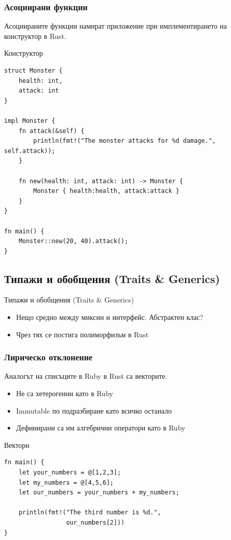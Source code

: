 \documentclass[xcolor=x11names,compress]{beamer}
\renewcommand{\(}{\begin{columns}}
\renewcommand{\)}{\end{columns}}
\newcommand{\<}[1]{\begin{column}{#1}}
\renewcommand{\>}{\end{column}}
\begin{document}
\begin{frame}[fragile]
  \frametitle{Асоциирани функции}

  \pause
  Асоциираните функции намират приложение при имплементирането на конструктор в Rust.

  \pause \vspace{0.5cm}
  \begin{block}{Конструктор}
    \begin{lstlisting}[basicstyle=\tiny]
struct Monster {
    health: int,
    attack: int
}

impl Monster {
    fn attack(&self) {
        println(fmt!("The monster attacks for %d damage.", self.attack));
    }

    fn new(health: int, attack: int) -> Monster {
        Monster { health:health, attack:attack }
    }
}

fn main() {
    Monster::new(20, 40).attack();
}
    \end{lstlisting}
  \end{block}
\end{frame}

\subsection{Типажи и обобщения (Traits \& Generics)}
\begin{frame}{Типажи и обобщения (Traits \& Generics)}
  \begin{itemize}
  \item Нещо средно между миксин и интерфейс. \pause Абстрактен клас? \pause
  \item Чрез тях се постига полиморфизъм в Rust
  \end{itemize}
\end{frame}

\begin{frame}[fragile]
  \frametitle{Лирическо отклонение}
  Аналогът на списъците в Ruby в Rust са векторите.

  \begin{itemize}[<+->]
  \item Не са хетерогенни като в Ruby
  \item Immutable по подразбиране като всичко останало
  \item Дефинирани са им алгебрични оператори като в Ruby
  \end{itemize}

  \pause
  \begin{block}{Вектори}
    \begin{lstlisting}[basicstyle=\small]
fn main() {
    let your_numbers = @[1,2,3];
    let my_numbers = @[4,5,6];
    let our_numbers = your_numbers + my_numbers;

    println(fmt!("The third number is %d.",
                 our_numbers[2]))
}
    \end{lstlisting}
  \end{block}
\end{frame}
\end{document}
